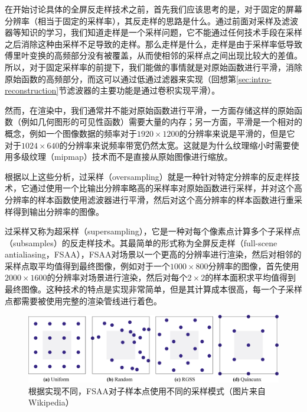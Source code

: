 在开始讨论具体的全屏反走样技术之前，首先我们应该思考的是，对于固定的屏幕分辨率（相当于固定的采样率），其反走样的思路是什么。通过前面对采样及滤波器等知识的学习，我们知道走样是一个采样问题，它不能通过任何技术手段在采样之后消除这种由采样不足导致的走样。那么走样是什么，走样是由于采样率低导致傅里叶变换的高频部分没有被覆盖，从而使相邻的采样点之间出现比较大的差值。所以，对于固定采样率的前提下，我们能做的事情就是对原始函数进行平滑，消除原始函数的高频部分，而这可以通过低通过滤器来实现（回想第\ref{sec:intro-reconstruction}节滤波器的主要功能是通过卷积实现平滑）。

然而，在渲染中，我们通常并不能对原始函数进行平滑，一方面存储这样的原始函数（例如几何图形的可见性函数）需要大量的内存；另一方面，平滑是一个相对的概念，例如一个图像数据的频率对于$1920\times 1200$的分辨率来说是平滑的，但是它对于$1024\times 640$的分辨率来说频率带宽仍然太宽。这就是为什么纹理缩小时需要使用多级纹理（mipmap）技术而不是直接从原始图像进行缩放。

根据以上这些分析，过采样（oversampling）就是一种针对特定分辨率的反走样技术，它通过使用一个比输出分辨率略高的采样率对原始函数进行采样，并对这个高分辨率的样本函数使用滤波器进行平滑，然后对这个高分辨率的样本函数进行重采样得到输出分辨率的图像。

过采样又称为超采样（supersampling），它是一种对每个像素点计算多个子采样点（subsamples）的反走样技术。其最简单的形式称为全屏反走样（full-scene antialiasing，FSAA），FSAA对场景以一个更高的分辨率进行渲染，然后对相邻的采样点取平均值得到最终图像，例如对于一个$1000\times 800$分辨率的图像，首先使用$2000\times 1600$的分辨率对场景进行渲染，然后对每个$2\times 2$的样本面积求平均值得到最终图像。这种技术的特点是实现非常简单，但是其计算成本很高，每一个子采样点都需要被使用完整的渲染管线进行着色。

\begin{figure}
\begin{fullwidth}
	\includegraphics[width=\thewidth]{figures/intro/sampling-pattern}
\caption{根据实现不同，FSAA对子样本点使用不同的采样模式（图片来自Wikipedia）}
\label{f:intro-Supersampling-pattern}
\end{fullwidth}
\end{figure}

